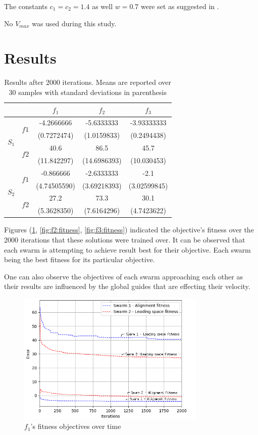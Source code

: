 \documentclass[conference]{IEEEtran}
\begin{document}
    The constants $ c_1 = c_2 = 1.4 $ as well $ w = 0.7 $ were set as suggested in \cite{vanwyk:overfitting-psoffnn}. 
    
    No $ V_{max} $ was used during this study.

\section{Results}


\begin{table}[htbp]
\caption{Results after 2000 iterations. Means are reported over 30 samples with standard deviations in parenthesis}
\begin{center}
\begin{tabular}{|c|c|c|c|c|}
\hline
& & $ f_1 $ & $ f_2 $ & $ f_3 $\\\hline
\multirow{4}{*}{$ S_1 $} &
\multirow{2}{*}{$ f1 $} &
-4.2666666 & -5.6333333 & -3.93333333\\
&&(0.7272474) & (1.0159833) & (0.2494438)\\
&\multirow{2}{*}{$ f2 $} &
40.6 & 86.5 & 45.7\\
&&(11.842297) & (14.6986393) & (10.030453)\\
\hline
\multirow{4}{*}{$ S_2 $} &
\multirow{2}{*}{$ f1 $} &
-0.866666 & -2.6333333 & -2.1\\
&&(4.74505590) & (3.69218393) & (3.02599845)\\
&\multirow{2}{*}{$ f2 $} &
27.2 & 73.3 & 30.1\\
&&(5.3628350) & (7.6164296) & (4.7423622)\\
\hline
\end{tabular}
\label{tab:glass}
\end{center}
\end{table}

Figures (\ref{fig:f1:fitness}, \ref{fig:f2:fitness}, \ref{fig:f3:fitness}) indicated the objective's fitness over the 2000 iterations that these solutions were trained over. It can be observed that each swarm is attempting to achieve result best for their objective. Each swarm being the best fitness for its particular objective.

One can also observe the objectives of each swarm approaching each other as their results are influenced by the global guides that are effecting their velocity.

\begin{figure}[htbp]
\centerline{\includegraphics[width=90mm]{images/results/f1-fitness.png}}
\caption{$f_1$'s fitness objectives over time }
\label{fig:f1:fitness}
\end{figure}
\end{document}
